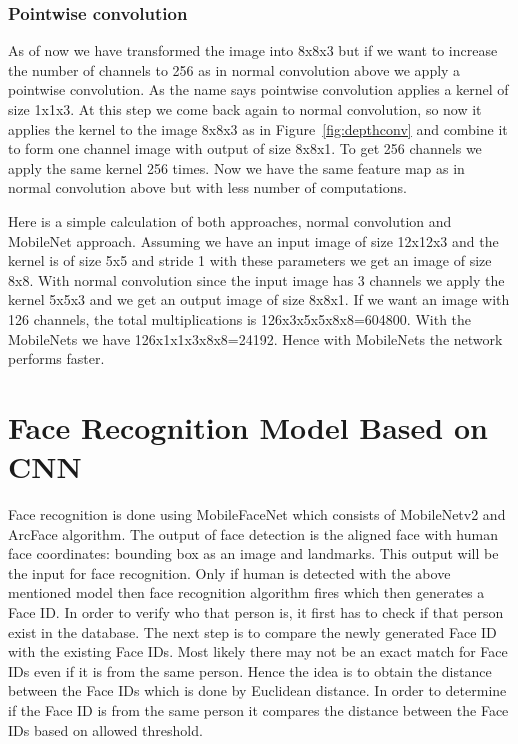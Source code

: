 \subsubsection{Pointwise convolution}
As of now we have transformed the image into 8x8x3 but if we want to increase the number of channels to 256 as in normal convolution above we apply a pointwise convolution. As the name says pointwise convolution applies a kernel of size 1x1x3. At this step we come back again to normal convolution, so now it applies the kernel to the image 8x8x3 as in Figure~\ref{fig:depthconv} and combine it to form one channel image with output of size 8x8x1. To get 256 channels we apply the same kernel 256 times. Now we have the same feature map as in normal convolution above but with less number of computations. 

Here is a simple calculation of both approaches, normal convolution and MobileNet approach. 
Assuming we have an input image of size 12x12x3 and the kernel is of size 5x5 and stride 1 with these parameters we get an image of size 8x8.
With normal convolution since the input image has 3 channels we apply the kernel 5x5x3 and we get an output image of size 8x8x1. If we want an image with 126 channels, the total multiplications is 126x3x5x5x8x8=604800. With the MobileNets we have 126x1x1x3x8x8=24192. Hence with MobileNets the network performs faster.


\section{Face Recognition Model Based on CNN}

Face recognition is done using MobileFaceNet \cite{DBLP:journals/corr/HowardZCKWWAA17} which consists of MobileNetv2 \cite{DBLP:journals/corr/abs-1801-04381} and ArcFace algorithm. The output of face detection is the aligned face with human face coordinates: bounding box as an image and landmarks. This output will be the input for face recognition. Only if human is detected with the above mentioned model then face recognition algorithm fires which then generates a Face ID. In order to verify who that person is, it first has to check if that person exist in the database. The next step is to compare the newly generated Face ID with the existing Face IDs. Most likely there may not be an exact match for Face IDs even if it is from the same person. Hence the idea is to obtain the distance between the Face IDs which is done by Euclidean distance. In order to determine if the Face ID is from the same person it compares the distance between the Face IDs based on allowed threshold. 

